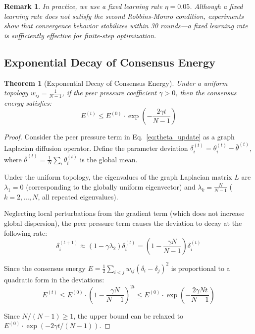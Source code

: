 \documentclass[12pt,a4paper]{article}
\newtheorem{theorem}{Theorem}[section]
\newtheorem{remark}{Remark}[section]
\begin{document}
\begin{remark}
In practice, we use a fixed learning rate $\eta = 0.05$. Although a fixed learning rate does not satisfy the second Robbins-Monro condition, experiments show that convergence behavior stabilizes within 30 rounds---a fixed learning rate is sufficiently effective for finite-step optimization.
\end{remark}

\subsection{Exponential Decay of Consensus Energy}

\begin{theorem}[Exponential Decay of Consensus Energy]\label{thm:energy}
Under a uniform topology $w_{ij} = \frac{1}{N-1}$, if the peer pressure coefficient $\gamma > 0$, then the consensus energy satisfies:
\begin{equation}
E^{(t)} \leq E^{(0)} \cdot \exp\!\left(-\frac{2\gamma t}{N-1}\right)
\end{equation}
\end{theorem}

\begin{proof}
Consider the peer pressure term in Eq.~\eqref{eq:theta_update} as a graph Laplacian diffusion operator. Define the parameter deviation $\delta_i^{(t)} = \theta_i^{(t)} - \bar{\theta}^{(t)}$, where $\bar{\theta}^{(t)} = \frac{1}{N}\sum_i \theta_i^{(t)}$ is the global mean.

Under the uniform topology, the eigenvalues of the graph Laplacian matrix $L$ are $\lambda_1 = 0$ (corresponding to the globally uniform eigenvector) and $\lambda_k = \frac{N}{N-1}$ ($k = 2, \ldots, N$, all repeated eigenvalues).

Neglecting local perturbations from the gradient term (which does not increase global dispersion), the peer pressure term causes the deviation to decay at the following rate:
\begin{equation}
\delta_i^{(t+1)} \approx (1 - \gamma \lambda_2) \delta_i^{(t)} = \left(1 - \frac{\gamma N}{N-1}\right) \delta_i^{(t)}
\end{equation}

Since the consensus energy $E = \frac{1}{2}\sum_{i<j} w_{ij} (\delta_i - \delta_j)^2$ is proportional to a quadratic form in the deviations:
\begin{equation}
E^{(t)} \leq E^{(0)} \cdot \left(1 - \frac{\gamma N}{N-1}\right)^{2t} \leq E^{(0)} \cdot \exp\!\left(-\frac{2\gamma N t}{N-1}\right)
\end{equation}

Since $N/(N-1) \geq 1$, the upper bound can be relaxed to $E^{(0)} \cdot \exp(-2\gamma t/(N-1))$.
\end{proof}
\end{document}
